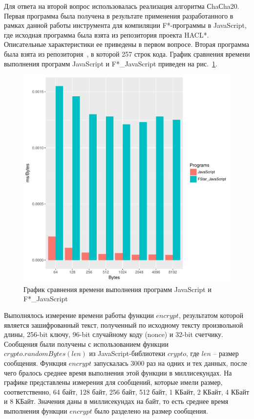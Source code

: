 Для ответа на второй вопрос использовалась реализация алгоритма СhaСha20. Первая программа была получена в результате применения разработанного в рамках данной работы инструмента для компиляции F*-программы в JavaScript, где исходная программа была взята из репозитория проекта HACL*. Описательные характеристики ее приведены в первом вопросе. Вторая программа была взята из репозитория~\cite{chachajs}, в которой 257 строк кода. График сравнения времени выполнения программ JavaScript и F*\_JavaScript приведен на рис.~\ref{fig:comparison}.

\begin{figure}[h!]
\begin{center}
\includegraphics[width=.9\textwidth]{Polubelova/Comparison}
\caption{График сравнения времени выполнения программ JavaScript и F*\_JavaScript}
\label{fig:comparison} 
\end{center}
\end{figure}

Выполнялось измерение времени работы функции $encrypt$, результатом которой является зашифрованный текст, полученный по исходному тексту произвольной длины, 256-bit ключу, 96-bit случайному коду (nonce) и 32-bit счетчику. Сообщения были получены с использованием функции $crypto.randomBytes(len)$ из JavaScript-библиотеки $crypto$, где $len$ -- размер сообщения. Функция $encrypt$ запускалась 3000 раз на одних и тех данных, после чего бралось среднее время выполнения этой функции в миллисекундах. На графике представлены измерения для сообщений, которые имели размер, соответственно, 64 байт, 128 байт, 256 байт, 512 байт, 1 КБайт, 2 КБайт, 4 КБайт и 8 КБайт. Значения даны в миллисекундах на байт, то есть среднее время выполнения функции $encrypt$ было разделено на размер сообщения.

